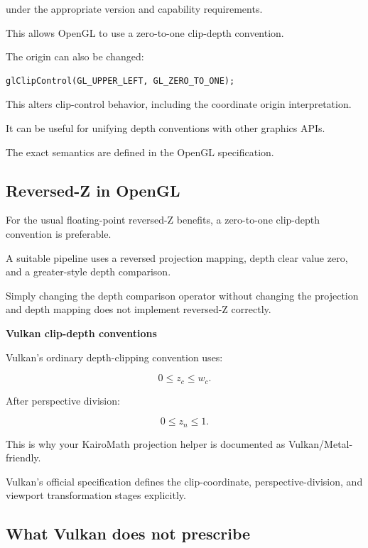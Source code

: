 under the appropriate version and capability requirements.

This allows OpenGL to use a zero-to-one clip-depth convention.

The origin can also be changed:

\begin{verbatim}
glClipControl(GL_UPPER_LEFT, GL_ZERO_TO_ONE);
\end{verbatim}

This alters clip-control behavior, including the coordinate origin interpretation.

It can be useful for unifying depth conventions with other graphics APIs.

The exact semantics are defined in the OpenGL  specification. 

\subsection{Reversed-Z in OpenGL}\label{02-foundations-ii-ch033-reversed-z-in-opengl}

\hypertarget{02-foundations-ii-ch033-reversed-z-in-opengl}{}

For the usual floating-point reversed-Z benefits, a zero-to-one clip-depth convention is preferable.

A suitable pipeline uses a reversed projection mapping, depth clear value zero, and a greater-style depth comparison.

Simply changing the depth comparison operator without changing the projection and depth mapping does not implement reversed-Z correctly.

\textbf{Vulkan clip-depth conventions}

Vulkan's ordinary depth-clipping convention uses:

\[
 \boxed{ 0\le z_c\le w_c }.
\]

After perspective division:

\[
 \boxed{ 0\le z_n\le1 }.
\]

This is why your KairoMath projection helper is documented as Vulkan/Metal-friendly.

Vulkan's official specification defines the clip-coordinate, perspective-division, and viewport transformation stages explicitly. 

\subsection{What Vulkan does not prescribe}\label{02-foundations-ii-ch033-what-vulkan-does-not-prescribe}

